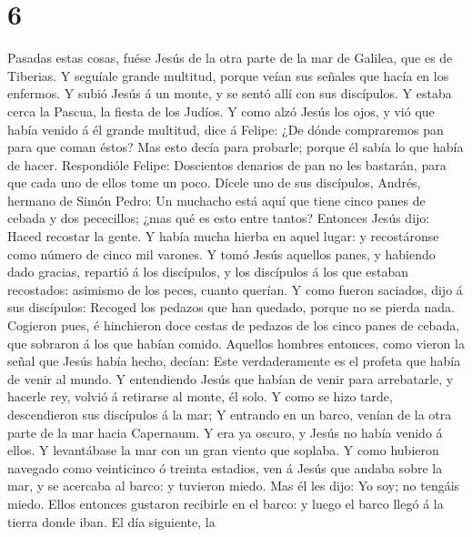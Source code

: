 \hypertarget{section-5}{%
\section{6}\label{section-5}}

 Pasadas estas cosas, fuése Jesús de la otra parte de la mar
de Galilea, que es de Tiberias.  Y seguíale grande multitud,
porque veían sus señales que hacía en los enfermos.  Y subió
Jesús á un monte, y se sentó allí con sus discípulos.  Y
estaba cerca la Pascua, la fiesta de los Judíos.  Y como
alzó Jesús los ojos, y vió que había venido á él grande multitud, dice á
Felipe: ¿De dónde compraremos pan para que coman éstos?  Mas
esto decía para probarle; porque él sabía lo que había de hacer.
 Respondióle Felipe: Doscientos denarios de pan no les
bastarán, para que cada uno de ellos tome un poco.  Dícele
uno de sus discípulos, Andrés, hermano de Simón Pedro:  Un
muchacho está aquí que tiene cinco panes de cebada y dos pececillos;
¿mas qué es esto entre tantos?  Entonces Jesús dijo: Haced
recostar la gente. Y había mucha hierba en aquel lugar: y recostáronse
como número de cinco mil varones.  Y tomó Jesús aquellos
panes, y habiendo dado gracias, repartió á los discípulos, y los
discípulos á los que estaban recostados: asimismo de los peces, cuanto
querían.  Y como fueron saciados, dijo á sus discípulos:
Recoged los pedazos que han quedado, porque no se pierda nada.
 Cogieron pues, é hinchieron doce cestas de pedazos de los
cinco panes de cebada, que sobraron á los que habían comido.
 Aquellos hombres entonces, como vieron la señal que Jesús
había hecho, decían: Este verdaderamente es el profeta que había de
venir al mundo.  Y entendiendo Jesús que habían de venir
para arrebatarle, y hacerle rey, volvió á retirarse al monte, él solo.
 Y como se hizo tarde, descendieron sus discípulos á la
mar;  Y entrando en un barco, venían de la otra parte de la
mar hacia Capernaum. Y era ya oscuro, y Jesús no había venido á ellos.
 Y levantábase la mar con un gran viento que soplaba.
 Y como hubieron navegado como veinticinco ó treinta
estadios, ven á Jesús que andaba sobre la mar, y se acercaba al barco: y
tuvieron miedo.  Mas él les dijo: Yo soy; no tengáis miedo.
 Ellos entonces gustaron recibirle en el barco: y luego el
barco llegó á la tierra donde iban.  El día siguiente, la
